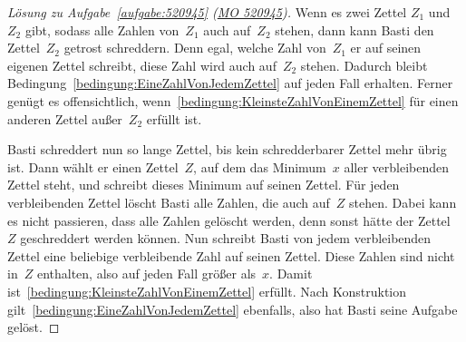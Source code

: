 \begin{proof}[Lösung zu Aufgabe~\ref{aufgabe:520945} \textmd{(\href{https://www.mathematik-olympiaden.de/moev/index.php?option=com_download&thema=a&format=raw&datei=A52094b.pdf}{MO 520945})}]
	Wenn es zwei Zettel $Z_1$ und $Z_2$ gibt, sodass alle Zahlen von~$Z_1$ auch auf~$Z_2$ stehen, dann kann Basti den Zettel~$Z_2$ getrost schreddern. Denn egal, welche Zahl von~$Z_1$ er auf seinen eigenen Zettel schreibt, diese Zahl wird auch auf~$Z_2$ stehen. Dadurch bleibt Bedingung~\ref{bedingung:EineZahlVonJedemZettel} auf jeden Fall erhalten. Ferner genügt es offensichtlich, wenn~\ref{bedingung:KleinsteZahlVonEinemZettel} für einen anderen Zettel außer~$Z_2$ erfüllt ist.
	
	Basti schreddert nun so lange Zettel, bis kein schredderbarer Zettel mehr übrig ist. Dann wählt er einen Zettel~$Z$, auf dem das Minimum~$x$ aller verbleibenden Zettel steht, und schreibt dieses Minimum auf seinen Zettel. Für jeden verbleibenden Zettel löscht Basti alle Zahlen, die auch auf~$Z$ stehen. Dabei kann es nicht passieren, dass alle Zahlen gelöscht werden, denn sonst hätte der Zettel~$Z$ geschreddert werden können. Nun schreibt Basti von jedem verbleibenden Zettel eine beliebige verbleibende Zahl auf seinen Zettel. Diese Zahlen sind nicht in~$Z$ enthalten, also auf jeden Fall größer als~$x$. Damit ist~\ref{bedingung:KleinsteZahlVonEinemZettel} erfüllt. Nach Konstruktion gilt~\ref{bedingung:EineZahlVonJedemZettel} ebenfalls, also hat Basti seine Aufgabe gelöst.
\end{proof}
